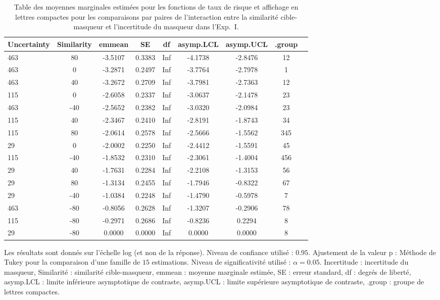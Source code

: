 \begin{table}[!t]
\caption[Table des moyennes marginales estimées pour les fonctions de taux de risque pour l'Expérience~I]{Table des moyennes marginales estimées pour les fonctions de taux de risque et affichage en lettres compactes pour les comparaisons par paires de l'interaction entre la similarité cible-masqueur et l'incertitude du masqueur dans l'Exp.~I.} 
\label{tab:cld_Exp-I}
\footnotesize
\centering
\begin{tabular}{|l|*{8}{c|}}
\hline
\textbf{Uncertainty} & \textbf{Similarity} & \textbf{emmean} & \textbf{SE} & \textbf{df} & \textbf{asymp.LCL} & \textbf{asymp.UCL} & \textbf{.group} \\ 
\hline
463 & 80 & -3.5107 & 0.3383 & Inf & -4.1738 & -2.8476 & 12 \\ 
463 & 0 & -3.2871 & 0.2497 & Inf & -3.7764 & -2.7978 & 1 \\ 
463 & 40 & -3.2672 & 0.2709 & Inf & -3.7981 & -2.7363 & 12 \\ 
115 & 0 & -2.6058 & 0.2337 & Inf & -3.0637 & -2.1478 & 23 \\ 
463 & -40 & -2.5652 & 0.2382 & Inf & -3.0320 & -2.0984 & 23 \\ 
115 & 40 & -2.3467 & 0.2410 & Inf & -2.8191 & -1.8743 & 34 \\ 
115 & 80 & -2.0614 & 0.2578 & Inf & -2.5666 & -1.5562 & 345 \\ 
29 & 0 & -2.0002 & 0.2250 & Inf & -2.4412 & -1.5591 & 45 \\ 
115 & -40 & -1.8532 & 0.2310 & Inf & -2.3061 & -1.4004 & 456 \\ 
29 & 40 & -1.7631 & 0.2284 & Inf & -2.2108 & -1.3153 & 56 \\ 
29 & 80 & -1.3134 & 0.2455 & Inf & -1.7946 & -0.8322 & 67 \\ 
29 & -40 & -1.0384 & 0.2248 & Inf & -1.4790 & -0.5978 & 7 \\ 
463 & -80 & -0.8056 & 0.2628 & Inf & -1.3207 & -0.2906 & 78 \\ 
115 & -80 & -0.2971 & 0.2686 & Inf & -0.8236 & 0.2294 & 8 \\ 
29 & -80 & 0.0000 & 0.0000 & Inf & 0.0000 & 0.0000 & 8 \\ 
\hline
\end{tabular}
\smallskip
\begin{flushleft}
Les résultats sont donnés sur l'échelle log (et non de la réponse). 
Niveau de confiance utilisé : $0.95$. 
Ajustement de la valeur p : Méthode de Tukey pour la comparaison d'une famille de $15$ estimations. 
Niveau de significativité utilisé : $\alpha= 0.05$. 
Incertitude : incertitude du masqueur, Similarité : similarité cible-masqueur, emmean : moyenne marginale estimée, SE : erreur standard, df : degrés de liberté, asymp.LCL : limite inférieure asymptotique de contraste, asymp.UCL : limite supérieure asymptotique de contraste, .group : groupe de lettres compactes.
\end{flushleft}
\end{table}

